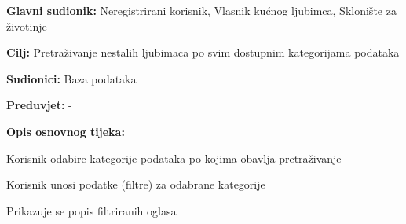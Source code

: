 \noindent {}
\begin{packed_item}

	\item \textbf{Glavni sudionik: }Neregistrirani korisnik, Vlasnik kućnog ljubimca, Sklonište za životinje
	\item  \textbf{Cilj:} Pretraživanje nestalih ljubimaca po svim dostupnim kategorijama podataka
	\item  \textbf{Sudionici:} Baza podataka
	\item  \textbf{Preduvjet:} -
	\item  \textbf{Opis osnovnog tijeka:}

	\item[] \begin{packed_enum}

		\item Korisnik odabire kategorije podataka po kojima obavlja pretraživanje
		\item Korisnik unosi podatke (filtre) za odabrane kategorije
		\item Prikazuje se popis filtriranih oglasa
	\end{packed_enum}
\end{packed_item}

